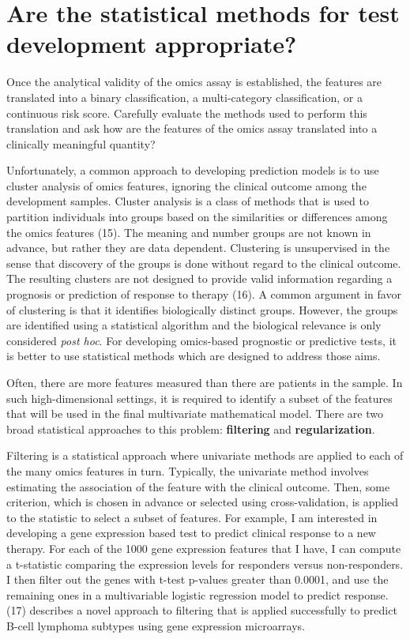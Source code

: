 \documentclass[11pt]{article}
\begin{document}
\section{Are the statistical methods for test development
appropriate?}\label{are-the-statistical-methods-for-test-development-appropriate}

Once the analytical validity of the omics assay is established, the
features are translated into a binary classification, a multi-category
classification, or a continuous risk score. Carefully evaluate the
methods used to perform this translation and ask how are the features of
the omics assay translated into a clinically meaningful quantity?

Unfortunately, a common approach to developing prediction models is to
use cluster analysis of omics features, ignoring the clinical outcome
among the development samples. Cluster analysis is a class of methods
that is used to partition individuals into groups based on the
similarities or differences among the omics features (15). The meaning
and number groups are not known in advance, but rather they are data
dependent. Clustering is unsupervised in the sense that discovery of the
groups is done without regard to the clinical outcome. The resulting
clusters are not designed to provide valid information regarding a
prognosis or prediction of response to therapy (16). A common argument
in favor of clustering is that it identifies biologically distinct
groups. However, the groups are identified using a statistical algorithm
and the biological relevance is only considered \emph{post hoc}. For
developing omics-based prognostic or predictive tests, it is better to
use statistical methods which are designed to address those aims.

Often, there are more features measured than there are patients in the
sample. In such high-dimensional settings, it is required to identify a
subset of the features that will be used in the final multivariate
mathematical model. There are two broad statistical approaches to this
problem: \textbf{filtering} and \textbf{regularization}.

Filtering is a statistical approach where univariate methods are applied
to each of the many omics features in turn. Typically, the univariate
method involves estimating the association of the feature with the
clinical outcome. Then, some criterion, which is chosen in advance or
selected using cross-validation, is applied to the statistic to select a
subset of features. For example, I am interested in developing a gene
expression based test to predict clinical response to a new therapy. For
each of the 1000 gene expression features that I have, I can compute a
t-statistic comparing the expression levels for responders versus
non-responders. I then filter out the genes with t-test p-values greater
than 0.0001, and use the remaining ones in a multivariable logistic
regression model to predict response. (17) describes a novel approach to
filtering that is applied successfully to predict B-cell lymphoma
subtypes using gene expression microarrays.
\end{document}
